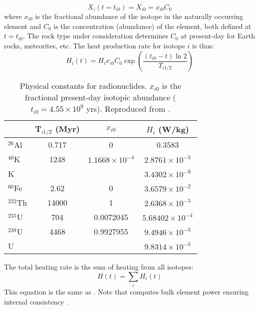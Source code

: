 \begin{equation}
X_i(t=t_{i0})=X_{i0} = x_{i0} C_0
\end{equation}
where $x_{i0}$ is the fractional abundance of the isotope in the naturally occurring element and $C_0$ is the concentration (abundance) of the element, both defined at $t=t_{i0}$.  The rock type under consideration determines $C_0$ at present-day for Earth rocks, meteorites, etc.  The heat production rate for isotope $i$ is thus:
\begin{equation}
H_i(t)=H_i x_{i0} C_0 \exp{\left( \frac{(t_{i0}-t) \ln2}{T_{i1/2}} \right)}
\end{equation}
\begin{table}[htbp]
\centering
\begin{tabular}{l c c c}
\hline
& T$_{i1/2}$ (Myr) & $x_{i0}$ & $H_i$ (W/kg)\\
\hline
$^{26}$Al & 0.717 & 0 & 0.3583\\
$^{40}$K & 1248 & $1.1668\times10^{-4}$ & $2.8761\times10^{-5}$\\
K & & & $3.4302\times10^{-9}$\\
$^{60}$Fe & 2.62 & 0 & $3.6579\times10^{-2}$\\
$^{232}$Th & 14000 & 1 & $2.6368\times10^{-5}$\\
$^{235}$U & 704 & 0.0072045 & $5.68402\times10^{-4}$\\
$^{238}$U & 4468 & 0.9927955 & $9.4946\times10^{-5}$\\
U & & & $9.8314\times10^{-5}$
\end{tabular}
\caption[Physical constants for radionuclides]{Physical constants for radionuclides.  $x_{i0}$ is the fractional present-day isotopic abundance ($t_{i0}=4.55\times10^9$ yrs).  Reproduced from \cite{RUE17}.}
\label{table:radionuclides}
\end{table}
The total heating rate is the sum of heating from all isotopes:
\begin{equation}
H(t) = \sum_i H_i(t)
\end{equation}
This equation is the same as \cite[Eq.~4.8][]{TS14}.  Note that \cite{RUE17} computes bulk element power ensuring internal consistency \citep[Sect.~3.7][]{RUE17}.